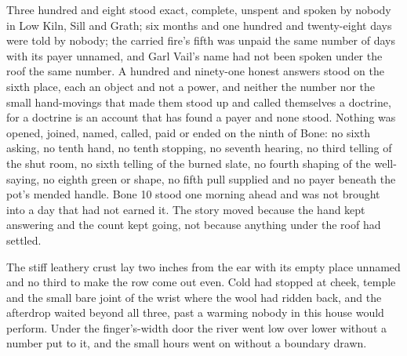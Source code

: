 Three hundred and eight stood exact, complete, unspent and spoken by nobody in Low Kiln, Sill and Grath; six months and one hundred and twenty-eight days were told by nobody; the carried fire's fifth was unpaid the same number of days with its payer unnamed, and Garl Vail's name had not been spoken under the roof the same number. A hundred and ninety-one honest answers stood on the sixth place, each an object and not a power, and neither the number nor the small hand-movings that made them stood up and called themselves a doctrine, for a doctrine is an account that has found a payer and none stood. Nothing was opened, joined, named, called, paid or ended on the ninth of Bone: no sixth asking, no tenth hand, no tenth stopping, no seventh hearing, no third telling of the shut room, no sixth telling of the burned slate, no fourth shaping of the well-saying, no eighth green or shape, no fifth pull supplied and no payer beneath the pot's mended handle. Bone 10 stood one morning ahead and was not brought into a day that had not earned it. The story moved because the hand kept answering and the count kept going, not because anything under the roof had settled.

The stiff leathery crust lay two inches from the ear with its empty place unnamed and no third to make the row come out even. Cold had stopped at cheek, temple and the small bare joint of the wrist where the wool had ridden back, and the afterdrop waited beyond all three, past a warming nobody in this house would perform. Under the finger's-width door the river went low over lower without a number put to it, and the small hours went on without a boundary drawn.
